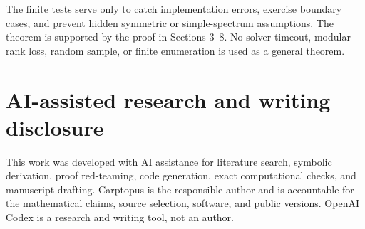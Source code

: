 \documentclass[11pt]{article}
\theoremstyle{remark}
\begin{document}
The finite tests serve only to catch implementation errors, exercise boundary cases, and prevent hidden symmetric or simple-spectrum assumptions. The theorem is supported by the proof in Sections 3--8. No solver timeout, modular rank loss, random sample, or finite enumeration is used as a general theorem.

\section{AI-assisted research and writing disclosure}


This work was developed with AI assistance for literature search, symbolic derivation, proof red-teaming, code generation, exact computational checks, and manuscript drafting. Carptopus is the responsible author and is accountable for the mathematical claims, source selection, software, and public versions. OpenAI Codex is a research and writing tool, not an author.
\end{document}
